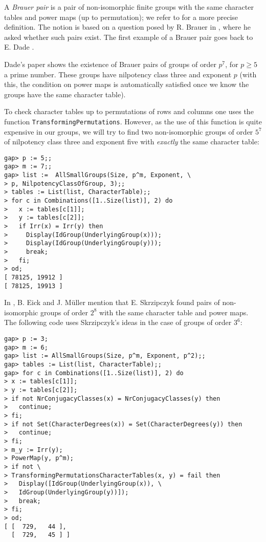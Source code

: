 A \emph{Brauer pair} is a pair of non-isomorphic finite groups 
with the same
character tables and power maps (up to permutation); 
we refer to \cite[Definition 2.6.1]{MR2680716} for a more precise definition. 
The notion is based on a question posed by R. Brauer in 
\cite{MR0178056}, where he asked whether such pairs exist. 
The first example of a Brauer pair goes back to E. Dade \cite{MR170957}. 

\begin{example}
    Dade's paper shows the existence of Brauer pairs of groups 
    of order $p^7$, for $p\geq5$ a prime number. 
    These groups
    have nilpotency class three 
    and exponent $p$ (with this, the condition on  
    power maps is automatically satisfied once we know the groups
    have the same character table). 
    
    To check character tables up to permutations of rows and columns 
    one uses the function \lstinline{TransformingPermutations}. However, 
    as the use of this function is quite expensive 
    in our groups, we will try to 
    find two non-isomorphic 
    groups of order $5^7$ of nilpotency class three
    and exponent five 
    with \emph{exactly} the same character table:
\begin{lstlisting}
gap> p := 5;;
gap> m := 7;;
gap> list :=  AllSmallGroups(Size, p^m, Exponent, \ 
> p, NilpotencyClassOfGroup, 3);;
> tables := List(list, CharacterTable);;
> for c in Combinations([1..Size(list)], 2) do
>   x := tables[c[1]];
>   y := tables[c[2]];
>   if Irr(x) = Irr(y) then
>     Display(IdGroup(UnderlyingGroup(x)));
>     Display(IdGroup(UnderlyingGroup(y)));
>     break;
>   fi;
> od;
[ 78125, 19912 ]
[ 78125, 19913 ]
\end{lstlisting}
\end{example}

\begin{example}
    In \cite{MR2256391}, B. Eick and J. M\"uller 
    mention that E. Skrzipczyk found pairs 
    of non-isomorphic 
    groups of order $2^8$ 
    with the same character table and 
    power maps. The following code
    uses Skrzipczyk's ideas in the case of  
    groups of order $3^6$:
\begin{lstlisting}
gap> p := 3;
gap> m := 6;
gap> list := AllSmallGroups(Size, p^m, Exponent, p^2);;
gap> tables := List(list, CharacterTable);;
gap> for c in Combinations([1..Size(list)], 2) do
> x := tables[c[1]];
> y := tables[c[2]];
> if not NrConjugacyClasses(x) = NrConjugacyClasses(y) then
>   continue;
> fi;
> if not Set(CharacterDegrees(x)) = Set(CharacterDegrees(y)) then
>   continue;
> fi;
> m_y := Irr(y);
> PowerMap(y, p^m);
> if not \ 
> TransformingPermutationsCharacterTables(x, y) = fail then
>   Display([IdGroup(UnderlyingGroup(x)), \ 
>   IdGroup(UnderlyingGroup(y))]);
>   break;
> fi;
> od;
[ [  729,   44 ],
  [  729,   45 ] ]
\end{lstlisting}
\end{example}

